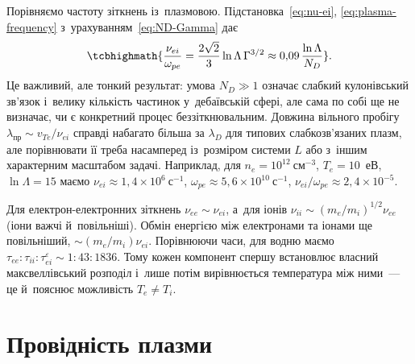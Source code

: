 Порівняємо частоту зіткнень із~плазмовою. Підстановка~\eqref{eq:nu-ei},
\eqref{eq:plasma-frequency} з~урахуванням~\eqref{eq:ND-Gamma} дає
\begin{equation}\label{eq:collisionless}
	\tcbhighmath{\frac{\nu_{ei}}{\omega_{pe}}=\frac{2\sqrt2}3\ln\Lambda\,\Gamma^{3/2}\approx0{,}09\,\frac{\ln\Lambda}{N_D}}.
\end{equation}
Це важливий, але тонкий результат: умова $N_D\gg1$ означає слабкий кулонівський зв'язок
і~велику кількість частинок у~дебаївській сфері, але сама по собі ще не визначає, чи є
конкретний процес беззіткнювальним. Довжина вільного пробігу $\lambda_{\mathrm{пр}}\sim
v_{Te}/\nu_{ei}$ справді набагато більша за $\lambda_D$ для типових слабкозв'язаних плазм,
але порівнювати її треба насамперед із~розміром системи $L$ або з~іншим характерним
масштабом задачі. Наприклад, для $n_e=10^{12}~\mathrm{см}^{-3}$, $T_e=10$~еВ,
$\ln\Lambda=15$ маємо $\nu_{ei}\approx1{,}4\times10^6~\mathrm{с}^{-1}$,
$\omega_{pe}\approx5{,}6\times10^{10}~\mathrm{с}^{-1}$,
$\nu_{ei}/\omega_{pe}\approx2{,}4\times10^{-5}$.

Для електрон-електронних зіткнень $\nu_{ee}\sim\nu_{ei}$, а~для іонів
$\nu_{ii}\sim(m_e/m_i)^{1/2}\nu_{ee}$ (іони важчі й~повільніші). Обмін енергією між
електронами та іонами ще повільніший, $\sim(m_e/m_i)\nu_{ei}$. Порівнюючи часи, для водню
маємо $\tau_{ee}:\tau_{ii}:\tau_{ei}^{\varepsilon}\sim1:43:1836$. Тому кожен компонент
спершу встановлює власний максвеллівський розподіл і~лише потім вирівнюється температура
між ними~--- це й~пояснює можливість $T_e\neq T_i$.



\section{Провідність плазми}



